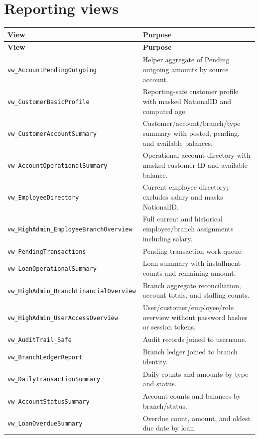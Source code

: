 \documentclass[11pt,a4paper,oneside]{report}
\begin{document}
\section{Reporting views}
\begin{longtable}{L{0.34\textwidth}L{0.60\textwidth}}
\toprule\textbf{View} & \textbf{Purpose}\\\midrule\endfirsthead
\toprule\textbf{View} & \textbf{Purpose}\\\midrule\endhead
\nolinkurl{vw_AccountPendingOutgoing} & Helper aggregate of Pending outgoing amounts by source account.\\
\nolinkurl{vw_CustomerBasicProfile} & Reporting-safe customer profile with masked NationalID and computed age.\\
\nolinkurl{vw_CustomerAccountSummary} & Customer/account/branch/type summary with posted, pending, and available balances.\\
\nolinkurl{vw_AccountOperationalSummary} & Operational account directory with masked customer ID and available balance.\\
\nolinkurl{vw_EmployeeDirectory} & Current employee directory; excludes salary and masks NationalID.\\
\nolinkurl{vw_HighAdmin_EmployeeBranchOverview} & Full current and historical employee/branch assignments including salary.\\
\nolinkurl{vw_PendingTransactions} & Pending transaction work queue.\\
\nolinkurl{vw_LoanOperationalSummary} & Loan summary with installment counts and remaining amount.\\
\nolinkurl{vw_HighAdmin_BranchFinancialOverview} & Branch aggregate reconciliation, account totals, and staffing counts.\\
\nolinkurl{vw_HighAdmin_UserAccessOverview} & User/customer/employee/role overview without password hashes or session tokens.\\
\nolinkurl{vw_AuditTrail_Safe} & Audit records joined to username.\\
\nolinkurl{vw_BranchLedgerReport} & Branch ledger joined to branch identity.\\
\nolinkurl{vw_DailyTransactionSummary} & Daily counts and amounts by type and status.\\
\nolinkurl{vw_AccountStatusSummary} & Account counts and balances by branch/status.\\
\nolinkurl{vw_LoanOverdueSummary} & Overdue count, amount, and oldest due date by loan.\\
\bottomrule
\end{longtable}
\end{document}
